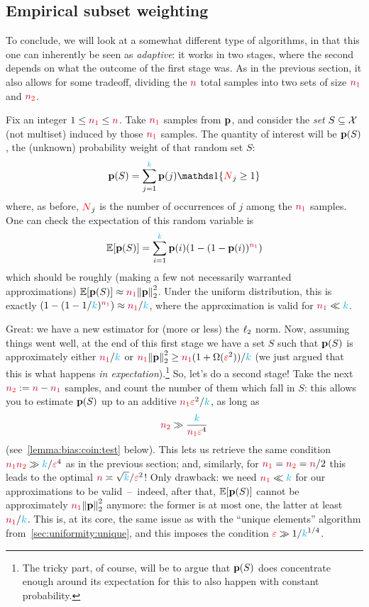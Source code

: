 \subsection{Empirical subset weighting} 
	\label{ssec:empirical:subset}
To conclude, we will look at a somewhat different type of algorithms, in that this one can inherently be seen as \emph{adaptive}: it works in two stages, where the second depends on what the outcome of the first stage was. As in the previous section, it also allows for some tradeoff, dividing the $\ns$ total samples into two sets of size $\nss$ and $\nst$.


Fix an integer $1\leq \nss \leq \ns$. Take $\nss$ \iid samples from $\p$, and consider the \emph{set} $S\subseteq\domain$ (not multiset) induced by those $\nss$ samples. The quantity of interest will be $\p(S)$, the (unknown) probability weight of that random set $S$:
\begin{equation}
    \p(S) = \sum_{j=1}^\ab \p(j) \indic{\occur_j \geq 1}
\end{equation}
where, as before, $\occur_j$ is the number of occurrences of $j$ among the $\nss$ samples. One can check the expectation of this random variable is
\begin{equation}
  \label{eq:expect:empirical:weight}
    \expect{\p(S)} = \sum_{i=1}^\ab \p(i) (1-(1-\p(i))^{\nss})
\end{equation}
which should be roughly (making a few not necessarily warranted approximations) $\expect{\p(S)}\approx \nss\normtwo{\p}^2$. Under the uniform distribution, this is exactly $(1-(1-1/\ab)^{\nss})\approx \nss/\ab$, where the approximation is valid for $\nss\ll \ab$.

Great: we have a new estimator for (more or less) the $\lp[2]$ norm. Now, assuming things went well, at the end of this first stage we have a set $S$ such that $\p(S)$ is approximately either $\nss/\ab$ or $\nss\normtwo{\p}^2\geq \nss(1+\Omega(\dst^2))/\ab$ (we just argued that this is what happens \emph{in expectation}).\footnote{The tricky part, of course, will be to argue that $\p(S)$ does concentrate enough around its expectation for this to also happen with constant probability.} So, let's do a second stage! Take the next $\nst \eqdef \ns-\nss$ samples, and count the number of them which fall in $S$: this allows you to estimate $\p(S)$  up to an additive $\nss\dst^2/\ab$, as long as
\[
      \nst \gg \frac{\ab}{\nss\dst^4}
\]
(see~\cref{lemma:bias:coin:test} below). This lets us retrieve the same condition $\nss\nst\gg \ab/\dst^4$ as in the previous section; and, similarly, for $\nss=\nst=\ns/2$ this leads to the optimal $\ns \asymp \sqrt{\ab}/\dst^2$! Only drawback: we need $\nss\ll \ab$ for our approximations to be valid~--~indeed, after that, $\expect{\p(S)}$ cannot be approximately $\nss\normtwo{\p}^2$ anymore: the former is at most one, the latter at least $\nss/\ab$. This is, at its core, the same issue as with the ``unique elements'' algorithm from~\cref{sec:uniformity:unique}, and this imposes the condition $\dst \gg 1/\ab^{1/4}$.

